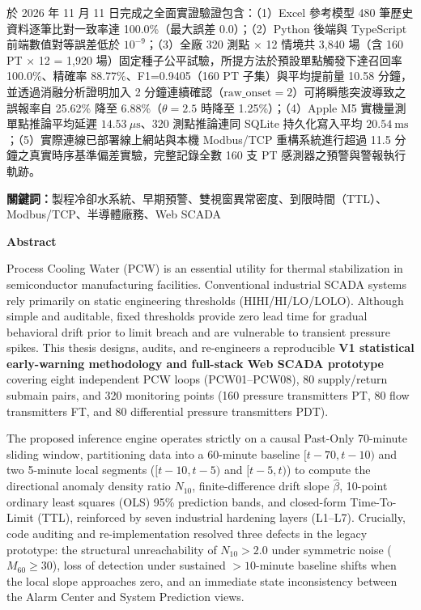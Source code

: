 \documentclass[fontset=none, a4paper, 12pt]{ctexart}
\begin{document}
於 2026 年 11 月 11 日完成之全面實證驗證包含：（1）Excel 參考模型 480 筆歷史資料逐筆比對一致率達 100.0\%（最大誤差 0.0）；（2）Python 後端與 TypeScript 前端數值對等誤差低於 $10^{-9}$；（3）全廠 320 測點 × 12 情境共 3,840 場（含 160 PT × 12 = 1,920 場）固定種子公平試驗，所提方法於預設單點觸發下達召回率 100.0\%、精確率 88.77\%、F1=0.9405（160 PT 子集）與平均提前量 10.58 分鐘，並透過消融分析證明加入 2 分鐘連續確認（$\text{raw\_onset}=2$）可將瞬態突波導致之誤報率自 25.62\% 降至 6.88\%（$\theta=2.5$ 時降至 1.25\%）；（4）Apple M5 實機量測單點推論平均延遲 $14.53\ \mu\mathrm{s}$、320 測點推論連同 SQLite 持久化寫入平均 $20.54\ \mathrm{ms}$；（5）實際連線已部署線上網站與本機 Modbus/TCP 重構系統進行超過 11.5 分鐘之真實時序基準偏差實驗，完整記錄全數 160 支 PT 感測器之預警與警報執行軌跡。

\vspace{1em}
\noindent \textbf{關鍵詞：}製程冷卻水系統、早期預警、雙視窗異常密度、到限時間（TTL）、Modbus/TCP、半導體廠務、Web SCADA

\newpage

{}
\begin{center}
\large\bfseries Abstract
\end{center}
\vspace{0.5em}

Process Cooling Water (PCW) is an essential utility for thermal stabilization in semiconductor manufacturing facilities. Conventional industrial SCADA systems rely primarily on static engineering thresholds (HIHI/HI/LO/LOLO). Although simple and auditable, fixed thresholds provide zero lead time for gradual behavioral drift prior to limit breach and are vulnerable to transient pressure spikes. This thesis designs, audits, and re-engineers a reproducible \textbf{V1 statistical early-warning methodology and full-stack Web SCADA prototype} covering eight independent PCW loops (PCW01--PCW08), 80 supply/return submain pairs, and 320 monitoring points (160 pressure transmitters PT, 80 flow transmitters FT, and 80 differential pressure transmitters PDT).

The proposed inference engine operates strictly on a causal Past-Only 70-minute sliding window, partitioning data into a 60-minute baseline $[t-70, t-10)$ and two 5-minute local segments ($[t-10, t-5)$ and $[t-5, t)$) to compute the directional anomaly density ratio $N_{10}$, finite-difference drift slope $\hat{\beta}$, 10-point ordinary least squares (OLS) 95\% prediction bands, and closed-form Time-To-Limit (TTL), reinforced by seven industrial hardening layers (L1--L7). Crucially, code auditing and re-implementation resolved three defects in the legacy prototype: the structural unreachability of $N_{10} > 2.0$ under symmetric noise ($M_{60} \ge 30$), loss of detection under sustained $>10$-minute baseline shifts when the local slope approaches zero, and an immediate state inconsistency between the Alarm Center and System Prediction views.
\end{document}
